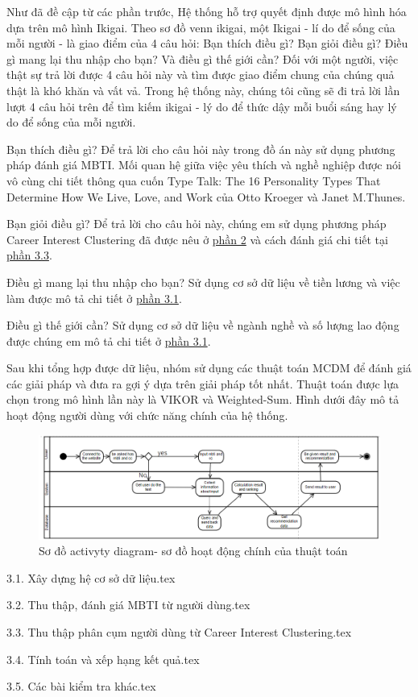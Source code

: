 Như đã đề cập từ các phần trước, Hệ thống hỗ trợ quyết định được 
mô hình hóa dựa trên mô hình Ikigai. Theo sơ đồ venn ikigai, một Ikigai - lí do để sống của mỗi người - là giao điểm của 4 câu hỏi: Bạn thích điều gì? Bạn giỏi điều gì? Điều gì mang lại thu nhập cho bạn? Và điều gì thế giới cần? Đối với một người, việc thật sự trả lời được 4 câu hỏi này và tìm được giao điểm chung của chúng quả thật là khó khăn và vất vả. Trong hệ thống này, chúng tôi cũng sẽ đi trả lời lần lượt 4 câu hỏi trên để tìm kiếm ikigai - lý do để thức dậy mỗi buổi sáng hay lý do để sống của mỗi người.

Bạn thích điều gì? Để trả lời cho câu hỏi này trong đồ án này sử dụng phương pháp đánh giá MBTI. Mối quan hệ giữa việc yêu thích và nghề nghiệp được nói vô cùng chi tiết thông qua cuốn Type Talk: The 16 Personality Types That Determine How We Live, Love, and Work của Otto Kroeger và Janet M.Thunes.

Bạn giỏi điều gì? Để trả lời cho câu hỏi này, chúng em sử dụng phương pháp Career Interest Clustering đã được nêu ở \hyperref[2]{phần 2} và cách đánh giá chi tiết tại \hyperref[3.3]{phần 3.3}.

Điều gì mang lại thu nhập cho bạn? Sử dụng cơ sở dữ liệu về tiền lương và việc làm được mô tả chi tiết ở \hyperref[3.1]{phần 3.1}.

Điều gì thế giới cần? Sử dụng cơ sở dữ liệu về ngành nghề và số lượng lao động được chúng em mô tả chi tiết ở \hyperref[3.1]{phần 3.1}.

Sau khi tổng hợp được dữ liệu, nhóm sử dụng các thuật toán MCDM để đánh giá các giải pháp và đưa ra gợi ý dựa trên giải pháp tốt nhất. Thuật toán được lựa chọn trong mô hình lần này là VIKOR và Weighted-Sum. Hình dưới đây mô tả hoạt động người dùng với chức năng chính của hệ thống. 

\begin{figure}[H]
        \centering
        \includegraphics[width=0.8\linewidth]{images/activity.png}
        \vspace{0.6cm}
        \caption{Sơ đồ activyty diagram- sơ đồ hoạt động chính của thuật toán}
    \end{figure}

{3.1. Xây dựng hệ cơ sở dữ liệu.tex}

{3.2. Thu thập, đánh giá MBTI từ người dùng.tex}

{3.3. Thu thập phân cụm người dùng từ Career Interest Clustering.tex}

{3.4. Tính toán và xếp hạng kết quả.tex}

{3.5. Các bài kiểm tra khác.tex}